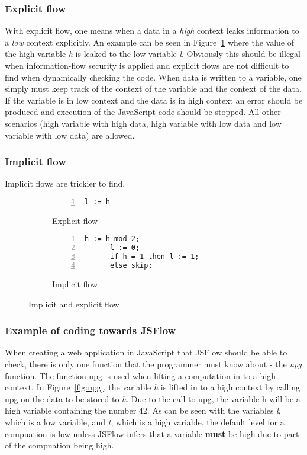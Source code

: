 \subsubsection{Explicit flow}
With explicit flow, one means when a data in a \emph{high} context leaks information to a \emph{low} context explicitly. An example can be seen in Figure~\ref{fig:expflow} where the value of the high variable \emph{h} is leaked to the low variable \emph{l}. Obviously this should be illegal when information-flow security is applied and explicit flows are not difficult to find when dynamically checking the code. When data is written to a variable, one simply must keep track of the context of the variable and the context of the data. If the variable is in low context and the data is in high context an error should be produced and execution of the JavaScript code should be stopped. All other scenarios (high variable with high data, high variable with low data and low variable with low data) are allowed.
\subsubsection{Implicit flow}
\label{chapter:implicit_flow}
Implicit flows are trickier to find.

\begin{figure}[h]
  \captionsetup[subfigure]{singlelinecheck=off,justification=raggedright}
  \begin{subfigure}[b]{0.5\textwidth}
    \begin{lstlisting}[numbers=left]
      l := h
    \end{lstlisting}
    \caption{Explicit flow}
    \label{fig:expflow}
  \end{subfigure}
  \begin{subfigure}[b]{0.5\textwidth}
    \begin{lstlisting}[numbers=left]
      h := h mod 2;
      l := 0;
      if h = 1 then l := 1;
      else skip;
    \end{lstlisting}
    \caption{Implicit flow}
    \label{fig:impflow}
  \end{subfigure}
  \caption{Implicit and explicit flow}
\end{figure}

\subsubsection{Example of coding towards JSFlow}
When creating a web application in JavaScript that JSFlow should be able to check, there is only one function that the programmer must know about - the \emph{upg} function. The function upg is used when lifting a computation in to a high context. In Figure~\ref{fig:upg}, the variable \emph{h} is lifted in to a high context by calling upg on the data to be stored to \emph{h}. Due to the call to upg, the variable h will be a high variable containing the number 42. As can be seen with the variables \emph{l}, which is a low variable, and \emph{t}, which is a high variable, the default level for a compuation is low unless JSFlow infers that a variable \textbf{must} be high due to part of the compuation being high.

